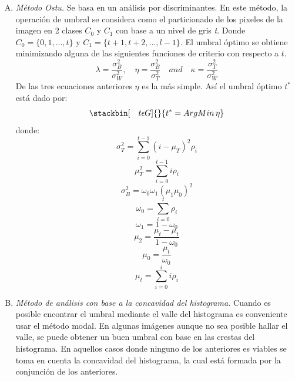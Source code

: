 \documentclass[12pt]{report}
\begin{document}
\begin{enumerate}[A.]
\item \textit{Método Ostu.} Se basa en un análisis por discriminantes. En este método, la operación de umbral se considera como el particionado de los pixeles de la imagen en 2 clases $C_{0}$ y $C_{1}$ con base a un nivel de gris \textit{t}. Donde $C_{0} = \{0,1, ...,t\}$ y $C_{1} = \{t + 1, t +2, ..., l - 1\}$. El umbral óptimo se obtiene minimizando alguna de las siguientes funciones de criterio con respecto a $t$.
\begin{equation} \lambda = \frac{\sigma_{B}^{2}}{\sigma_{W}^{2}},\quad \eta = \frac{\sigma_{B}^{2}}{\sigma_{T}^{2}}\quad and \quad \kappa = \frac{\sigma_{T}^{2}}{\sigma_{W}^{2}} \end{equation}
De las tres ecuaciones anteriores $\eta$ es la más simple. Así el umbral óptimo $t^{*}$ está dado por:
\begin{equation}  \stackbin[\quad t \epsilon G]{}{t^{*} = ArgMin\,\eta} \end{equation}
donde:
\begin{equation}\sigma_{T}^{2} = \sum_{i = 0}^{t - 1}(i - \mu_{T})^2\rho_{i} \end{equation}
\begin{equation}\mu_{T}^{2} = \sum_{i = 0}^{t - 1} i\rho_{i} \end{equation}
\begin{equation}\sigma_{B}^{2} = \omega_{0}\omega_{1}(\mu_{1}\mu_{0})^2 \end{equation}
\begin{equation}\omega_{0} = \sum_{i = 0}^{t}\rho_{i} \end{equation}
\begin{equation}\omega_{1} = 1 - \omega_{0} \end{equation}
\begin{equation}\mu_{2} = \frac{\mu_{t} - \mu_{t}}{1 - \omega_{0}} \end{equation}
\begin{equation}\mu_{0} = \frac{\mu_{t}}{\omega_{0}} \end{equation}
\begin{equation}\mu_{t} = \sum_{i = 0}^{i}i\rho_{i} \end{equation}

\item \textit{Método de análisis con base a la concavidad del histograma.} Cuando es posible encontrar el umbral mediante el valle del histograma es conveniente usar el método modal. En algunas imágenes aunque no sea posible hallar el valle, se puede obtener un buen umbral con base en las crestas del histograma. En aquellos casos donde ninguno de los anteriores es viables se toma en cuenta la concavidad del histograma, la cual está formada por la conjunción de los anteriores.


\end{enumerate}
\end{document}
